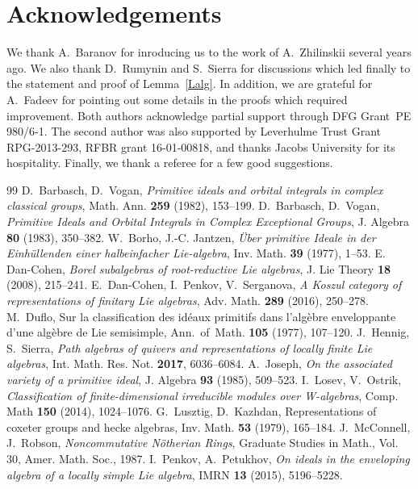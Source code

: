 \documentclass[10pt]{amsart}\oddsidemargin -1mm \evensidemargin -1mm \topmargin -15mm\headheight5mm \headsep 3.5mm \textheight 245mm\textwidth 170mm %
\begin{document}
\section{Acknowledgements}
 We thank A.~Baranov for inroducing us to the work of A.~Zhilinskii several years ago. We also thank D.~Rumynin and S.~Sierra for discussions which led finally to the statement and proof of Lemma~\ref{Lalg}. In addition, we are grateful for A.~Fadeev for pointing out some details in the proofs which required improvement. Both authors acknowledge partial support through DFG Grant~PE 980/6-1. The second author was also supported by Leverhulme Trust Grant RPG-2013-293, RFBR grant 16-01-00818, and thanks Jacobs University for its hospitality. Finally, we thank a referee for a few good suggestions.
\begin{thebibliography}{99}
 D.~Barbasch, D.~Vogan, {\it Primitive ideals and orbital integrals in complex classical groups}, Math. Ann. {\bf 259} (1982), 153--199.
 D.~Barbasch, D.~Vogan, {\it Primitive Ideals and Orbital Integrals in Complex Exceptional Groups}, J. Algebra {\bf 80} (1983), 350--382.
 W.~Borho, J.-C. Jantzen,  {\it \"Uber primitive Ideale in der Einh\"ullenden einer halbeinfacher Lie-algebra}, Inv. Math. {\bf 39} (1977), 1--53.
 E. Dan-Cohen, {\it Borel subalgebras of root-reductive Lie algebras}, J. Lie Theory {\bf 18} (2008), 215--241.
 E.~Dan-Cohen, I.~Penkov, V.~Serganova, {\it A Koszul category of representations of finitary Lie algebras}, Adv. Math. {\bf 289} (2016), 250--278.
 M.~Duflo, Sur la classiﬁcation des id\'eaux primitifs dans l'alg\`ebre enveloppante d'une alg\`ebre de Lie semisimple, Ann.~of~Math. {\bf 105} (1977), 107--120.
 J.~Hennig, S.~Sierra, {\it Path algebras of quivers and representations of locally finite Lie algebras}, Int. Math. Res. Not. {\bf 2017}, 6036--6084.
 A.~Joseph, {\it On the associated variety of a primitive ideal}, J. Algebra {\bf 93} (1985), 509--523.
 I.~Losev,  V.~Ostrik, {\it Classiﬁcation of finite-dimensional irreducible modules over W-algebras}, Comp. Math {\bf 150} (2014), 1024--1076.
 G.~Lusztig, D.~Kazhdan, Representations of coxeter groups and hecke algebras, Inv. Math. {\bf 53} (1979), 165--184.
 J.~McConnell, J.~Robson, {\it Noncommutative N\"otherian Rings}, Graduate Studies in Math., Vol. 30, Amer. Math. Soc., 1987.
 I.~Penkov, A.~Petukhov, {\it On ideals in the enveloping algebra of a locally simple Lie algebra},  IMRN {\bf 13} (2015), 5196--5228.

\end{thebibliography}
\end{document}
